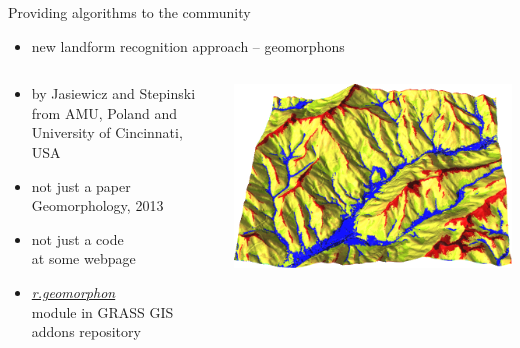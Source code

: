 \documentclass[xcolor={dvipsnames,usenames},beamer,aspectratio=169]{beamer}
\newcommand{\amodule}[1]{\href{http://grass.osgeo.org/grass70/manuals/addons/#1.html}{\emph{#1}}}
\begin{document}
\begin{frame}{Providing algorithms to the community}

\begin{itemize}
  \item new landform recognition approach -- geomorphons
\end{itemize}

\begin{columns}
\begin{column}{0.4\textwidth}

\begin{itemize}
  \item by Jasiewicz and Stepinski
    {\tiny from AMU, Poland and University of Cincinnati, USA}
  \item not just a paper
    {\tiny Geomorphology, 2013}
  \item not just a code
    \\{\tiny at some webpage}
  \item \amodule{r.geomorphon}
    \\{\tiny module in GRASS GIS addons repository}
\end{itemize}

\end{column}
\begin{column}{0.58\textwidth}

\begin{center}
  \includegraphics[width=\textwidth]{vis/geomorphon_3d}
\end{center}

\end{column}
\end{columns}

\end{frame}
\end{document}
